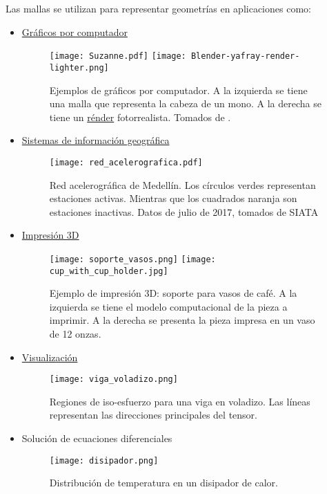 Las mallas se utilizan para representar geometrías en aplicaciones como:
\begin{itemize}
    \item \href{https://en.wikipedia.org/wiki/Computer_graphics}{Gráficos por computador}
    \begin{figure}[H]
        \centering
        \texttt{[image: Suzanne.pdf]}\hspace{5mm}
        \texttt{[image: Blender-yafray-render-lighter.png]}
        \caption{Ejemplos de gráficos por computador. A la izquierda se tiene una malla que representa la cabeza de un mono. A la derecha se tiene un \href{https://en.wikipedia.org/wiki/Rendering_(computer_graphics)}{rénder} fotorrealista. Tomados de \cite{wiki:suzanne, wiki:encendedor}.}
    \end{figure}
    
    \item \href{https://en.wikipedia.org/wiki/Geographic_information_system}{Sistemas de información geográfica}
    \begin{figure}[H]
        \centering
        \texttt{[image: red\_acelerografica.pdf]}
        \caption{Red acelerográfica de Medellín. Los círculos verdes representan estaciones activas. Mientras que los cuadrados naranja son estaciones inactivas. Datos de julio de 2017, tomados de SIATA\cite{SIATA_acelerografica}}
    \end{figure}
    
    \item \href{https://en.wikipedia.org/wiki/3D_printing}{Impresión 3D}
    \begin{figure}[H]
        \centering
        \texttt{[image: soporte\_vasos.png]}\hspace{5mm}
        \texttt{[image: cup\_with\_cup\_holder.jpg]}
        \caption{Ejemplo de impresión 3D: soporte para vasos de café. A la izquierda se tiene el modelo computacional de la pieza a imprimir. A la derecha se presenta la pieza impresa en un vaso de 12 onzas.}
    \end{figure}


    \item \href{https://en.wikipedia.org/wiki/Visualization_(graphics)}{Visualización}
    \begin{figure}[H]
        \centering
        \texttt{[image: viga\_voladizo.png]}
        \caption{Regiones de iso-esfuerzo para una viga en voladizo. Las líneas representan las direcciones principales del tensor.}
    \end{figure}

    \pagebreak
    \item Solución de ecuaciones diferenciales
    \begin{figure}[H]
        \centering
        \texttt{[image: disipador.png]}
        \caption{Distribución de temperatura en un disipador de calor.}
    \end{figure}
\end{itemize}

